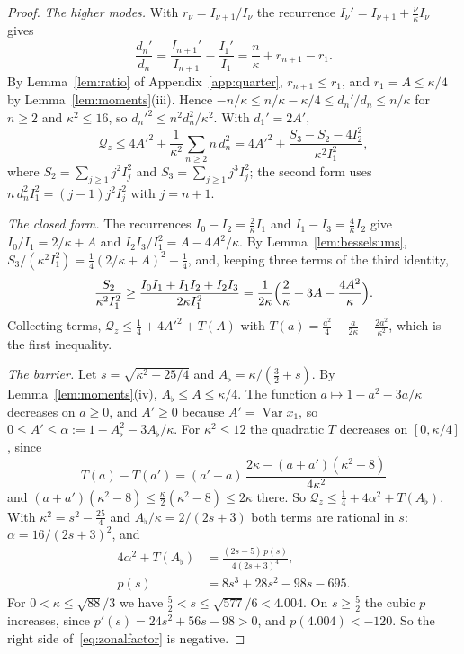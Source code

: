\documentclass[aps,prd,twocolumn,superscriptaddress,nofootinbib,longbibliography,floatfix,amsmath,amssymb,10pt]{revtex4-2}
\theoremstyle{definition}
\theoremstyle{remark}
\newcommand{\Var}{\operatorname{Var}}
\begin{document}
\begin{proof}
\emph{The higher modes.} With $r_\nu=I_{\nu+1}/I_\nu$ the recurrence
$I_\nu'=I_{\nu+1}+\frac\nu\kappa I_\nu$ gives
\[
\frac{d_n'}{d_n}=\frac{I_{n+1}'}{I_{n+1}}-\frac{I_1'}{I_1}=\frac n\kappa+
r_{n+1}-r_1 .
\]
By Lemma~\ref{lem:ratio} of Appendix~\ref{app:quarter}, $r_{n+1}\le r_1$, and
$r_1=A\le\kappa/4$ by Lemma~\ref{lem:moments}(iii). Hence $-n/\kappa\le
n/\kappa-\kappa/4\le d_n'/d_n\le n/\kappa$ for $n\ge2$ and $\kappa^2\le16$, so
$d_n'^2\le n^2d_n^2/\kappa^2$. With $d_1'=2A'$,
\[
\mathcal Q_z\le4A'^2+\frac1{\kappa^2}\sum_{n\ge2}n\,d_n^2=4A'^2+\frac{S_3-
S_2-4I_2^2}{\kappa^2I_1^2},
\]
where $S_2=\sum_{j\ge1}j^2I_j^2$ and $S_3=\sum_{j\ge1}j^3I_j^2$; the
second form uses $n\,d_n^2I_1^2=(j-1)j^2I_j^2$ with $j=n+1$.

\emph{The closed form.} The recurrences $I_0-I_2=\frac2\kappa I_1$ and
$I_1-I_3=\frac4\kappa I_2$ give $I_0/I_1=2/\kappa+A$ and $I_2I_3/I_1^2=A-
4A^2/\kappa$. By Lemma~\ref{lem:besselsums},
$S_3/(\kappa^2I_1^2)=\frac14(2/\kappa+A)^2+\frac14$, and, keeping three
terms of the third identity,
\[
\frac{S_2}{\kappa^2I_1^2}\ge\frac{I_0I_1+I_1I_2+I_2I_3}{2\kappa I_1^2}=
\frac1{2\kappa}\Bigl(\frac2\kappa+3A-\frac{4A^2}\kappa\Bigr).
\]
Collecting terms, $\mathcal Q_z\le\frac14+4A'^2+T(A)$ with $T(a)=\frac{a^2}4-
\frac a{2\kappa}-\frac{2a^2}{\kappa^2}$, which is the first inequality.

\emph{The barrier.} Let $s=\sqrt{\kappa^2+25/4}$ and $A_\flat=\kappa/(\frac32
+s)$. By Lemma~\ref{lem:moments}(iv), $A_\flat\le A\le\kappa/4$. The function
$a\mapsto1-a^2-3a/\kappa$ decreases on $a\ge0$, and $A'\ge0$ because $A'=
\Var x_1$, so $0\le A'\le\alpha:=1-A_\flat^2-3A_\flat/\kappa$. For $\kappa^2\le
12$ the quadratic $T$ decreases on $[0,\kappa/4]$, since
\[
T(a)-T(a')=(a'-a)\,\frac{2\kappa-(a+a')(\kappa^2-8)}{4\kappa^2}
\]
and $(a+a')(\kappa^2-8)\le\frac\kappa2(\kappa^2-8)\le2\kappa$ there. So
$\mathcal Q_z\le\frac14+4\alpha^2+T(A_\flat)$. With $\kappa^2=s^2-\frac{25}4$
and $A_\flat/\kappa=2/(2s+3)$ both terms are rational in $s$:
$\alpha=16/(2s+3)^2$, and
\begin{equation}\label{eq:zonalfactor}
\begin{aligned}
4\alpha^2+T(A_\flat)&=\frac{(2s-5)\,p(s)}{4(2s+3)^4},\\
p(s)&=8s^3+28s^2-98s-695 .
\end{aligned}
\end{equation}
For $0<\kappa\le\sqrt{88}/3$ we have $\frac52<s\le\sqrt{577}/6<4.004$. On
$s\ge\frac52$ the cubic $p$ increases, since $p'(s)=24s^2+56s-98>0$, and
$p(4.004)<-120$. So the right side of~\eqref{eq:zonalfactor} is negative.
\end{proof}
\end{document}
